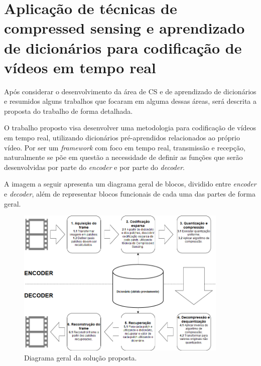 \documentclass[cic,tc]{iiufrgs}
\begin{document}
\chapter{Aplicação de técnicas de compressed sensing e aprendizado de dicionários para codificação de vídeos em tempo real}
\label{cap:proposta}
Após considerar o desenvolvimento da área de CS e de aprendizado de dicionários e 
resumidos alguns trabalhos que focaram em alguma dessas áreas, será descrita a proposta 
do trabalho de forma detalhada.

O trabalho proposto visa desenvolver uma metodologia para codificação de vídeos em
tempo real, utilizando dicionários pré-aprendidos relacionados ao próprio vídeo.
Por ser um \textit{framework} com foco em tempo real, transmissão e recepção, 
naturalmente se põe em questão 
a necessidade de definir as funções que serão desenvolvidas por parte do \textit{encoder}
e por parte do \textit{decoder}.


A imagem a seguir apresenta um diagrama geral de blocos, dividido entre \textit{encoder}
e \textit{decoder}, além de representar blocos funcionais de cada uma das partes de 
forma geral.
\begin{figure}[H]
    \caption{Diagrama geral da solução proposta.}
    \begin{center}
        \includegraphics[width=0.9\textwidth]{img/DiagramaFinal.png}
    \end{center}
    \label{fig:geral}
\end{figure}
\end{document}
